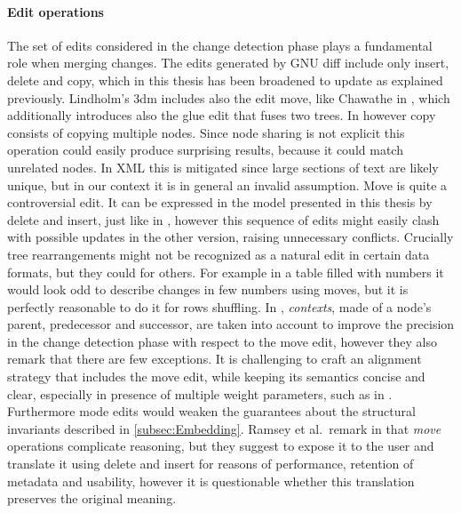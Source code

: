 \documentclass[../Thesis.tex]{subfiles}
\begin{document}
	\paragraph{Edit operations}
	The set of edits considered in the change detection phase plays
	a fundamental role when merging changes.
	The edits generated by GNU diff include only insert, delete and copy, 
	which in this thesis has been broadened to update as explained previously.
	Lindholm's 3dm \cite{Lind04} includes also the edit move, like Chawathe in 
	\cite{Chawathe96, Chawathe97}, which additionally introduces also the 
	glue edit that fuses two trees.
	In \cite{Lind04} however copy consists of copying multiple nodes.
	Since node sharing is not explicit this operation could easily produce 
	surprising results, because it could match unrelated nodes. In XML
	this is mitigated since large sections of text are likely unique, but
	in our context it is in general an invalid assumption.
	Move is quite a controversial edit.
	It can be expressed in the model presented in this thesis by delete 
	and insert, just like in \cite{Ramsey01}, however this sequence 
	of edits might easily clash with possible updates in the other version,
	raising unnecessary conflicts.
	Crucially tree rearrangements	might not be recognized as a natural
	edit in certain data formats, but they could for others. 
	For example in a table filled with numbers it would look odd to describe
	changes in few numbers using moves, but it is perfectly reasonable
	to do it for rows shuffling. 
	In \cite{Lind04}, \emph{contexts}, made of a node's parent, 
	predecessor	and successor, are taken into account to improve the precision
	in the change detection phase with respect to the move edit, 
	however they also remark that there are few exceptions.
	It is challenging to craft an alignment strategy that includes the move edit,
	while keeping its semantics concise and clear, especially in presence
	of multiple weight parameters, such as in \cite{Chawathe97}.
	Furthermore mode edits would weaken the guarantees about the
	structural invariants described in \ref{subsec:Embedding}.
	Ramsey et al.\ remark in \cite{Ramsey01} that \emph{move} operations 
	complicate reasoning, but they suggest to expose it to the user and 
	translate	it using delete and insert for reasons of performance, retention of 
	metadata 	and usability, however it is questionable whether this translation
	preserves the original meaning.
	
	
\end{document}
